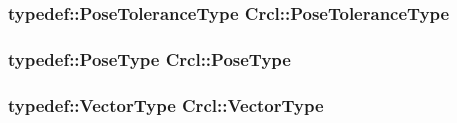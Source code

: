 \hypertarget{namespaceCrcl_ac805071e16341b82d4fa4e12b7f3ac6f}{
\subsubsection[{Pose\-Tolerance\-Type}]{\setlength{\rightskip}{0pt plus 5cm}typedef\-::\-Pose\-Tolerance\-Type Crcl\-::\-Pose\-Tolerance\-Type}}\label{namespaceCrcl_ac805071e16341b82d4fa4e12b7f3ac6f}
\hypertarget{namespaceCrcl_acc6c82b52280f4d0e74b82a92400956e}{
\subsubsection[{Pose\-Type}]{\setlength{\rightskip}{0pt plus 5cm}typedef\-::\-Pose\-Type Crcl\-::\-Pose\-Type}}\label{namespaceCrcl_acc6c82b52280f4d0e74b82a92400956e}
\hypertarget{namespaceCrcl_ae868d4ece511d1485ed5d9118395aef8}{
\subsubsection[{Vector\-Type}]{\setlength{\rightskip}{0pt plus 5cm}typedef\-::\-Vector\-Type Crcl\-::\-Vector\-Type}}\label{namespaceCrcl_ae868d4ece511d1485ed5d9118395aef8}

